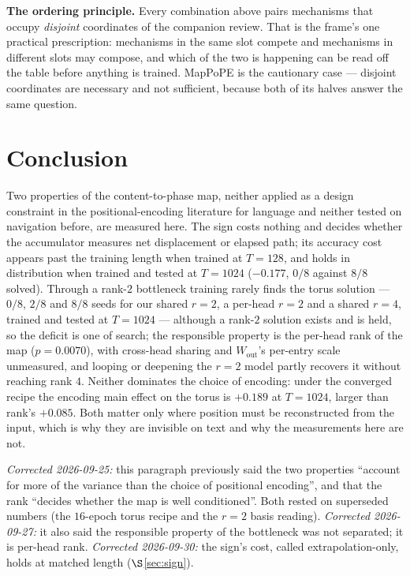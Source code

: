 \documentclass[11pt]{article}
\begin{document}
\noindent \textbf{The ordering principle.} Every combination above pairs mechanisms
that occupy \emph{disjoint} coordinates of the companion review. That is the frame's
one practical prescription: mechanisms in the same slot compete and mechanisms in
different slots may compose, and which of the two is happening can be read off the
table before anything is trained. MapPoPE is the cautionary case --- disjoint
coordinates are necessary and not sufficient, because both of its halves answer the
same question.


\section{Conclusion}

Two properties of the content-to-phase map, neither applied as a design constraint in
the positional-encoding literature for language and neither tested on navigation
before, are measured here. The sign costs nothing and decides whether the accumulator
measures net displacement or elapsed path; its accuracy cost appears past the training
length when trained at $T=128$, and holds in distribution when trained and tested at
$T=1024$ ($-0.177$, $0/8$ against $8/8$ solved). Through a rank-$2$ bottleneck training rarely finds the torus solution ---
$0/8$, $2/8$ and $8/8$ seeds for our shared $r=2$, a per-head $r=2$ and a shared $r=4$,
trained and tested at $T=1024$ --- although a rank-$2$ solution exists and is held, so
the deficit is one of search; the responsible property is the per-head rank of the map
($p=0.0070$), with cross-head sharing and $W_{\mathrm{out}}$'s per-entry scale unmeasured,
and looping or deepening the $r=2$ model partly recovers it without reaching rank $4$. Neither dominates the choice of encoding: under the
converged recipe the encoding main effect on the torus is $+0.189$ at $T=1024$, larger
than rank's $+0.085$. Both matter only where position must be reconstructed from the
input, which is why they are invisible on text and why the measurements here are not.

\emph{Corrected 2026-09-25:} this paragraph previously said the two properties ``account
for more of the variance than the choice of positional encoding'', and that the rank
``decides whether the map is well conditioned''. Both rested on superseded numbers (the
$16$-epoch torus recipe and the $r=2$ basis reading).
\emph{Corrected 2026-09-27:} it also said the responsible property of the bottleneck was not
separated; it is per-head rank.
\emph{Corrected 2026-09-30:} the sign's cost, called extrapolation-only, holds at matched
length ($\S$\ref{sec:sign}).
\end{document}
